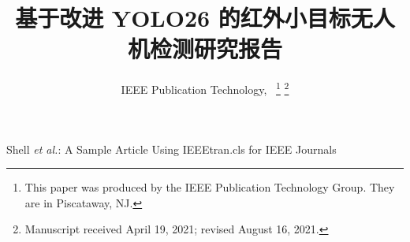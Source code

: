 \documentclass[lettersize,journal]{IEEEtran}
\begin{document}
\title{基于改进 YOLO26 的红外小目标无人机检测研究报告}

\author{IEEE Publication Technology,~
\thanks{This paper was produced by the IEEE Publication Technology Group. They are in Piscataway, NJ.}%
\thanks{Manuscript received April 19, 2021; revised August 16, 2021.}}

%
{Shell \MakeLowercase{\textit{et al.}}: A Sample Article Using IEEEtran.cls for IEEE Journals}


\maketitle




\end{document}
